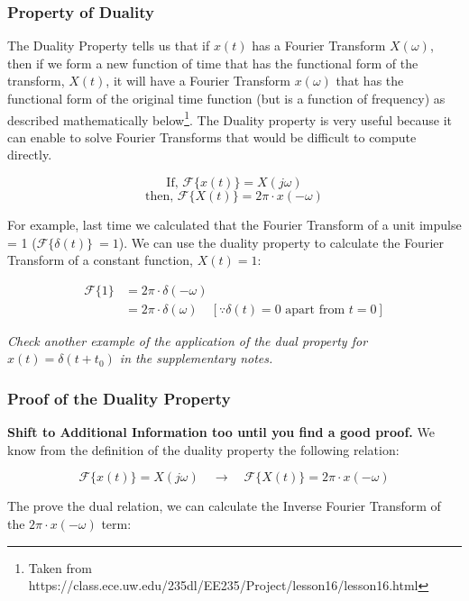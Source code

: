 \documentclass[letterpaper,12pt]{article}
\begin{document}
\subsubsection*{Property of Duality}

The Duality Property tells us that if $x(t)$ has a Fourier Transform $X(\omega)$, then if we form a new function of time that has the functional form of the transform, $X(t)$, it will have a Fourier Transform $x(\omega)$ that has the functional form of the original time function (but is a function of frequency) as described mathematically below\footnote{Taken from https://class.ece.uw.edu/235dl/EE235/Project/lesson16/lesson16.html}. The Duality property is very useful because it can enable to solve Fourier Transforms that would be difficult to compute directly.

\[ \text{If, } \mathcal{F}\{x(t)\} = X(j\omega)\]
\[ \text{then, } \mathcal{F}\{X(t)\} = 2\pi\cdot x(-\omega)\]

For example, last time we calculated that the Fourier Transform of a unit impulse = 1 ($\mathcal{F}\{\delta(t)\}\ = 1$). We can use the duality property to calculate the Fourier Transform of a constant function, $X(t) = 1$:

\begin{equation*}
    \begin{aligned}
        \mathcal{F}\{1\} & = 2\pi\cdot\delta(-\omega)                                                         \\
                         & = 2\pi\cdot\delta(\omega) \quad [\text{$\because \delta(t) = 0$ apart from $t=0$}]
    \end{aligned}
\end{equation*}

\textit{Check another example of the application of the dual property for $x(t) = \delta(t + t_{0})$ in the supplementary notes.}

\subsubsection*{Proof of the Duality Property}
\textbf{Shift to Additional Information too until you find a good proof.}
We know from the definition of the duality property the following relation:

\[\mathcal{F}\{x(t)\} = X(j\omega) \quad \rightarrow \quad \mathcal{F}\{X(t)\} = 2\pi\cdot x(-\omega)\]

The prove the dual relation, we can calculate the Inverse Fourier Transform of the $2\pi\cdot x(-\omega)$ term:
\end{document}
